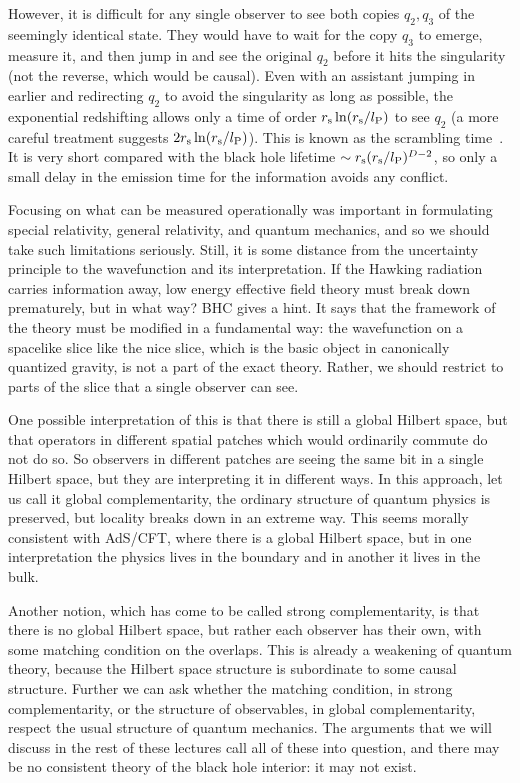 \documentclass[12pt]{article}
\newcommand{\rmx}{\rm}
\newcommand{\rs}{r_{\rmx s}}
\newcommand{\lp}{l_{\rmx P}}
\begin{document}
However, it is difficult for any single observer to see both copies $q_2, q_3$ of the seemingly identical state.  They would have to wait for the copy $q_3$ to emerge, measure it, and then jump in and see the original $q_2$ before it hits the singularity (not the reverse, which would be causal).  Even with an assistant jumping in earlier and redirecting $q_2$ to avoid the singularity as long as possible, the exponential redshifting allows only a time of order $\rs \ln (\rs/\lp)$ to see $q_2$ (a more careful treatment suggests $2 \rs \ln (\rs/\lp)$).  This is known as the scrambling time~\cite{Hayden:2007cs,Sekino:2008he}.  It is very short compared with the black hole lifetime $\sim \rs  (\rs/\lp)^{D-2}$, so only a small delay in the emission time for the information avoids any conflict.


Focusing on what can be measured operationally was important in formulating special relativity, general relativity, and quantum mechanics, and so we should take such limitations seriously.  Still, it is some distance from the uncertainty principle to the wavefunction and its interpretation.  If the Hawking radiation carries information away, low energy effective field theory must break down prematurely, but in what way?  BHC gives a hint.  It says that the framework of the theory must be modified in a fundamental way: the wavefunction on a spacelike slice like the nice slice, which is the basic object in canonically quantized gravity, is not a part of the exact theory.  Rather, we should restrict to parts of the slice that a single observer can see.

One possible interpretation of this is that there is still a global Hilbert space, but that operators in different spatial patches which would ordinarily commute do not do so.  So observers in different patches are seeing the same bit in a single Hilbert space, but they are interpreting it in different ways.  In this approach, let us call it global complementarity, the ordinary structure of quantum physics is preserved, but locality breaks down in an extreme way.  This seems morally consistent with AdS/CFT, where there is a global Hilbert space, but in one interpretation the physics lives in the boundary and in another it lives in the bulk.  %

Another notion, which has come to be called strong complementarity, is that there is no global Hilbert space, but rather each observer has their own, with some matching condition on the overlaps.  This is already a weakening of quantum theory, because the Hilbert space structure is subordinate to some causal structure.   Further we can ask whether the matching condition, in strong complementarity, or the structure of observables, in global complementarity, respect the usual structure of quantum mechanics.  The arguments that we will discuss in the rest of these lectures call all of these into question, and there may be no consistent theory of the black hole interior: it may not exist.
\end{document}
